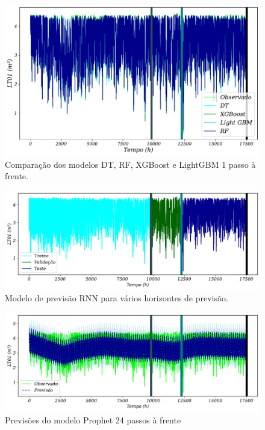 \begin{figure}[!htb]
	\centering
	\caption{Comparação dos modelos DT, RF, XGBoost e LightGBM 1 passo à frente.}
	\label{fig:lr-xgb-lgbm-rf}
	\includegraphics[width=0.7\linewidth]{Resultados/Figuras/LR-XGB-LGBM-RF}
	
\end{figure}
\begin{figure}[!htb]
	\centering
	\caption{Modelo de previsão RNN para vários horizontes de previsão.}
	\label{fig:rnn}
	\includegraphics[width=0.9\linewidth]{Resultados/Figuras/RNN}
\end{figure}
\begin{figure}[!htb]
	\centering
	\caption{Previsões do modelo Prophet 24 passos à frente}\label{fig:prophet1}
	\includegraphics[width=0.9\linewidth]{Resultados/Figuras/prophet1}	
\end{figure}


